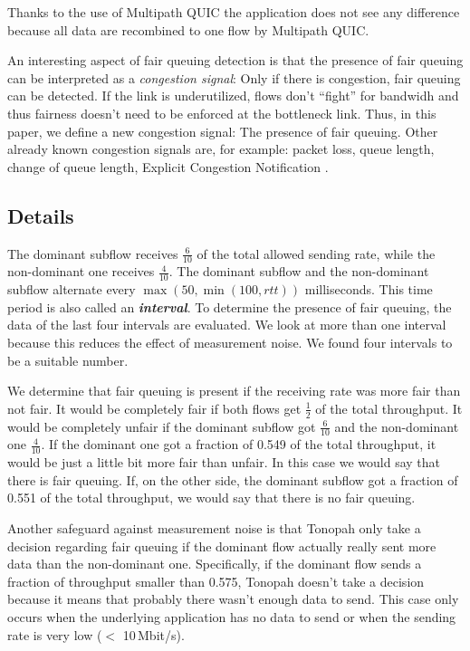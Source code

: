 \documentclass[conference]{IEEEtran}
\begin{document}
Thanks to the use of Multipath QUIC \cite{liu_multipath_2022} the application does not see any difference because all data are recombined to one flow by Multipath QUIC. 

An interesting aspect of fair queuing detection is that the presence of fair queuing can be interpreted as a \textit{congestion signal}: 
Only if there is congestion, fair queuing can be detected. If the link is underutilized, flows don't ``fight'' for bandwidh and thus fairness doesn't need to be enforced at the bottleneck link. 
Thus, in this paper, we define a new congestion signal: The presence of fair queuing. Other already known congestion signals are, for example: 
packet loss, queue length, change of queue length, Explicit Congestion Notification \cite{mathis_relentless_2009,hayes_revisiting_2011}. 

\subsection{Details}

The dominant subflow receives $\frac{6}{10}$ of the total allowed sending rate, while the non-dominant one receives $\frac{4}{10}$. 
The dominant subflow and the non-dominant subflow alternate every $\max{(50, \min{(100, \textit{rtt})})}$ milliseconds. 
This time period is also called an \textbf{\textit{interval}}. To determine the presence of fair queuing, the data of the last four intervals are evaluated. 
We look at more than one interval because this reduces the effect of measurement noise. We found four intervals to be a suitable number. 

We determine that fair queuing is present if the receiving rate was more fair than not fair. 
It would be completely fair if both flows get $\frac{1}{2}$ of the total throughput. It would be completely unfair if the dominant subflow got $\frac{6}{10}$ and the non-dominant one $\frac{4}{10}$. 
If the dominant one got a fraction of 0.549 of the total throughput, it would be just a little bit more fair than unfair. In this case we would say that there is fair queuing. 
If, on the other side, the dominant subflow got a fraction of 0.551 of the total throughput, we would say that there is no fair queuing. 

Another safeguard against measurement noise is that Tonopah only take a decision regarding fair queuing if the dominant flow actually really sent more data than the non-dominant one. 
Specifically, if the dominant flow sends a fraction of throughput smaller than 0.575, Tonopah doesn't take a decision because it means that probably there wasn't enough data to send. 
This case only occurs when the underlying application has no data to send or when the sending rate is very low ($<$ 10\,Mbit/s). 
\end{document}
